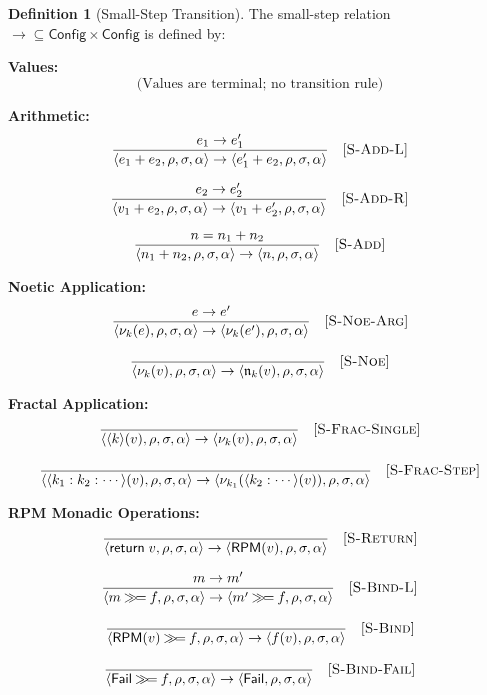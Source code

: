 \documentclass[11pt,twoside,openright]{book}
\theoremstyle{definition}
\newtheorem{definition}{Definition}[chapter]
\theoremstyle{plain}
\theoremstyle{remark}
\newcommand{\noe}[1]{\nu_{#1}}
\newcommand{\rpmret}{\mathsf{return}}
\newcommand{\rpmbind}{\mathbin{\gg\!=}}
\newcommand{\Config}{\mathsf{Config}}
\newcommand{\smallstep}{\to}
\newcommand{\Failed}{\mathsf{Fail}}
\begin{document}
\begin{definition}[Small-Step Transition]
\label{def:small-step}
The small-step relation $\smallstep \subseteq \Config \times \Config$ is defined by:

\textbf{Values:}
\[
\text{(Values are terminal; no transition rule)}
\]

\textbf{Arithmetic:}
\[
\frac{e_1 \smallstep e_1'}{\langle e_1 + e_2, \rho, \sigma, \alpha \rangle \smallstep \langle e_1' + e_2, \rho, \sigma, \alpha \rangle} \quad [\textsc{S-Add-L}]
\]

\[
\frac{e_2 \smallstep e_2'}{\langle v_1 + e_2, \rho, \sigma, \alpha \rangle \smallstep \langle v_1 + e_2', \rho, \sigma, \alpha \rangle} \quad [\textsc{S-Add-R}]
\]

\[
\frac{n = n_1 + n_2}{\langle n_1 + n_2, \rho, \sigma, \alpha \rangle \smallstep \langle n, \rho, \sigma, \alpha \rangle} \quad [\textsc{S-Add}]
\]

\textbf{Noetic Application:}
\[
\frac{e \smallstep e'}{\langle \noe{k}(e), \rho, \sigma, \alpha \rangle \smallstep \langle \noe{k}(e'), \rho, \sigma, \alpha \rangle} \quad [\textsc{S-Noe-Arg}]
\]

\[
\frac{}{\langle \noe{k}(v), \rho, \sigma, \alpha \rangle \smallstep \langle \mathfrak{n}_k(v), \rho, \sigma, \alpha \rangle} \quad [\textsc{S-Noe}]
\]

\textbf{Fractal Application:}
\[
\frac{}{\langle \langle k \rangle(v), \rho, \sigma, \alpha \rangle \smallstep \langle \noe{k}(v), \rho, \sigma, \alpha \rangle} \quad [\textsc{S-Frac-Single}]
\]

\[
\frac{}{\langle \langle k_1 : k_2 : \cdots \rangle(v), \rho, \sigma, \alpha \rangle \smallstep \langle \noe{k_1}(\langle k_2 : \cdots \rangle(v)), \rho, \sigma, \alpha \rangle} \quad [\textsc{S-Frac-Step}]
\]

\textbf{RPM Monadic Operations:}
\[
\frac{}{\langle \rpmret\; v, \rho, \sigma, \alpha \rangle \smallstep \langle \mathsf{RPM}(v), \rho, \sigma, \alpha \rangle} \quad [\textsc{S-Return}]
\]

\[
\frac{m \smallstep m'}{\langle m \rpmbind f, \rho, \sigma, \alpha \rangle \smallstep \langle m' \rpmbind f, \rho, \sigma, \alpha \rangle} \quad [\textsc{S-Bind-L}]
\]

\[
\frac{}{\langle \mathsf{RPM}(v) \rpmbind f, \rho, \sigma, \alpha \rangle \smallstep \langle f(v), \rho, \sigma, \alpha \rangle} \quad [\textsc{S-Bind}]
\]

\[
\frac{}{\langle \Failed \rpmbind f, \rho, \sigma, \alpha \rangle \smallstep \langle \Failed, \rho, \sigma, \alpha \rangle} \quad [\textsc{S-Bind-Fail}]
\]


\end{definition}
\end{document}
